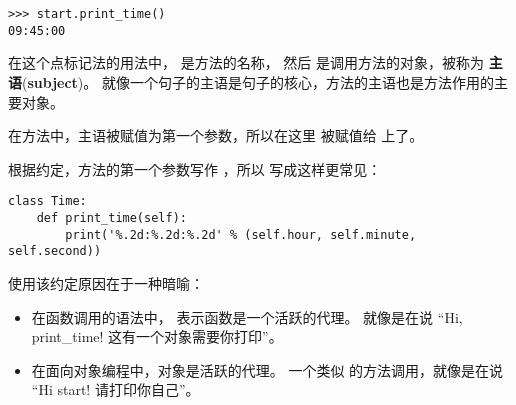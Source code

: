 \begin{lstlisting}
>>> start.print_time()
09:45:00
\end{lstlisting}

在这个点标记法的用法中， 是方法的名称，
然后  是调用方法的对象，被称为 {\bf 主语}({\bf subject})。
就像一个句子的主语是句子的核心，方法的主语也是方法作用的主要对象。

在方法中，主语被赋值为第一个参数，所以在这里  被赋值给  上了。
  


根据约定，方法的第一个参数写作  ，所以  写成这样更常见：

\begin{lstlisting}
class Time:
    def print_time(self):
        print('%.2d:%.2d:%.2d' % (self.hour, self.minute, self.second))
\end{lstlisting}

%
使用该约定原因在于一种暗喻：


\begin{itemize}

\item 在函数调用的语法中， 表示函数是一个活跃的代理。
就像是在说 ``Hi, print\_time! 这有一个对象需要你打印''。

\item 在面向对象编程中，对象是活跃的代理。  一个类似  的方法调用，就像是在说 ``Hi start! 请打印你自己''。

\end{itemize}

